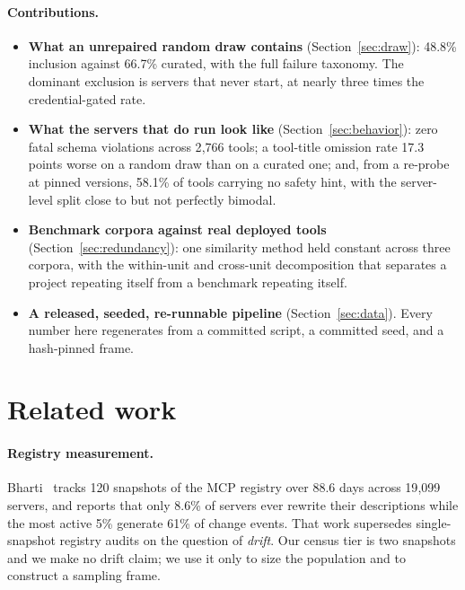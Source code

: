\documentclass[11pt]{article}
\begin{document}
\paragraph{Contributions.}
\begin{itemize}
  \item \textbf{What an unrepaired random draw contains} (Section~\ref{sec:draw}):
    48.8\% inclusion against 66.7\% curated, with the full failure taxonomy. The
    dominant exclusion is servers that never start, at nearly three times the
    credential-gated rate.
  \item \textbf{What the servers that do run look like}
    (Section~\ref{sec:behavior}): zero fatal schema violations across 2{,}766
    tools; a tool-title omission rate 17.3 points worse on a random draw than on
    a curated one; and, from a re-probe at pinned versions, 58.1\% of tools
    carrying no safety hint, with the server-level split close to but not
    perfectly bimodal.
  \item \textbf{Benchmark corpora against real deployed tools}
    (Section~\ref{sec:redundancy}): one similarity method held constant across
    three corpora, with the within-unit and cross-unit decomposition that
    separates a project repeating itself from a benchmark repeating itself.
  \item \textbf{A released, seeded, re-runnable pipeline} (Section~\ref{sec:data}).
    Every number here regenerates from a committed script, a committed seed, and
    a hash-pinned frame.
\end{itemize}

\section{Related work}
\label{sec:related}

\paragraph{Registry measurement.}
Bharti~\cite{drift} tracks 120 snapshots of the MCP registry over 88.6 days across
19{,}099 servers, and reports that only 8.6\% of servers ever rewrite their
descriptions while the most active 5\% generate 61\% of change events. That work
supersedes single-snapshot registry audits on the question of \emph{drift}. Our
census tier is two snapshots and we make no drift claim; we use it only to size
the population and to construct a sampling frame.
\end{document}
